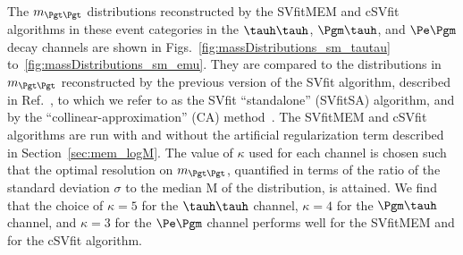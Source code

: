The $m_{\Pgt\Pgt}$ distributions reconstructed by the SVfitMEM and cSVfit algorithms in these event categories 
in the $\tauh\tauh$, $\Pgm\tauh$, and $\Pe\Pgm$ decay channels are shown in Figs.~\ref{fig:massDistributions_sm_tautau} to~\ref{fig:massDistributions_sm_emu}.
They are compared to the distributions in $m_{\Pgt\Pgt}$  reconstructed by the previous version of the
SVfit algorithm, described in Ref.~\cite{SVfit}, to which we refer to as the SVfit ``standalone'' (SVfitSA) algorithm,
and by the ``collinear-approximation'' (CA) method~\cite{massRecoCollinearApprox}.
The SVfitMEM and cSVfit algorithms are run with and without the artificial regularization term described in Section~\ref{sec:mem_logM}.
The value of $\kappa$ used for each channel is chosen such that the optimal resolution on $m_{\Pgt\Pgt}$, 
quantified in terms of the ratio of the standard deviation $\sigma$ to the median $\textrm{M}$ of the distribution,
is attained.
We find that the choice of $\kappa = 5$ for the $\tauh\tauh$ channel, $\kappa = 4$ for the $\Pgm\tauh$ channel,
and $\kappa = 3$ for the $\Pe\Pgm$ channel performs well for the SVfitMEM and for the cSVfit algorithm.

%
%

